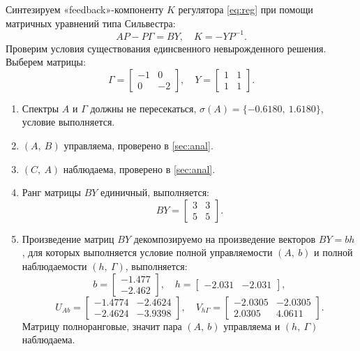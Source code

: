 Синтезируем «feedback»-компоненту $K$ регулятора \eqref{eq:reg} при 
помощи матричных уравнений типа Сильвестра:
\begin{equation*}
    AP-P\Gamma=BY,\quad K=-YP^{-1}.
\end{equation*}
Проверим условия существования единсвенного невырожденного решения. 
Выберем матрицы:
\begin{equation*}
    \Gamma=\begin{bmatrix}
        -1 & 0 \\ 0 & -2
    \end{bmatrix},\quad
    Y = \begin{bmatrix}
        1 & 1 \\ 1 & 1
    \end{bmatrix}.
\end{equation*}
\begin{enumerate}
    \item Спектры $A$ и $\Gamma$ должны не пересекаться, $\sigma(A)=\{-0.6180,\ 1.6180\}$,
    условие выполняется.
    \item $(A,\ B)$ управляема, проверено в \autoref{sec:anal}.
    \item $(C,\ A)$ наблюдаема, проверено в \autoref{sec:anal}.
    \item Ранг матрицы $BY$ единичный, выполняется:
    \begin{equation*}
        BY=\begin{bmatrix}
            3	&3\\
            5	&5
        \end{bmatrix}.
    \end{equation*}
    \item Произведение матриц $BY$ декомпозируемо на произведение векторов $BY=bh$, 
    для которых выполняется условие полной управляемости $(A,\ b)$ и полной 
    наблюдаемости $(h,\ \Gamma)$, выполняется:
\begin{equation*}
    b=\begin{bmatrix}
        -1.477\\
        -2.462
    \end{bmatrix},\quad
    h=\begin{bmatrix}
        -2.031 & -2.031
    \end{bmatrix},
\end{equation*}
\begin{equation*}
    U_{Ab}=\begin{bmatrix}
        -1.4774&	-2.4624\\
        -2.4624&	-3.9398
    \end{bmatrix},\quad
    V_{h\Gamma}=\begin{bmatrix}
        -2.0305&	-2.0305\\
        2.0305&	4.0611
    \end{bmatrix}.
\end{equation*}
Матрицу полноранговые, значит пара $(A,\ b)$ управляема и  $(h,\ \Gamma)$ наблюдаема.
\end{enumerate}
